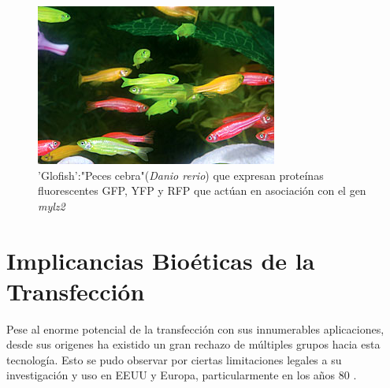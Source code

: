 \documentclass[fleqn,10pt]{SelfArx} %
\begin{document}
  \begin{figure}[ht]\centering
\includegraphics[width=\linewidth]{images/danio}
\caption{'Glofish':"Peces cebra"(\textit{Danio rerio}) que expresan proteínas fluorescentes GFP, YFP y RFP que actúan en asociación con el gen \textit{mylz2} \cite{gong2003development}}
\end{figure}

  

\section{Implicancias Bioéticas de la Transfección}

Pese al enorme potencial de la transfección con sus innumerables aplicaciones, desde sus origenes ha existido un gran rechazo de múltiples grupos hacia esta tecnología. Esto se pudo observar por ciertas limitaciones legales a su investigación y uso en EEUU y Europa, particularmente en los años 80 \cite{Spink} .





\end{document}
